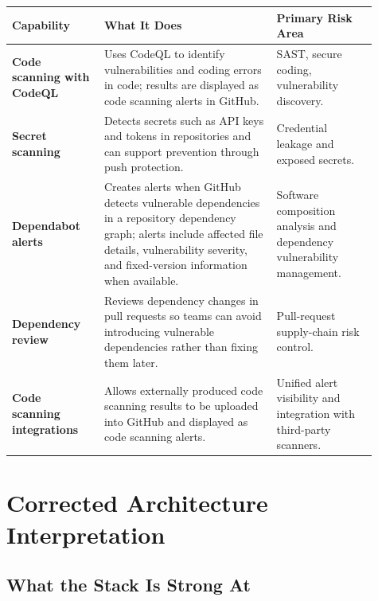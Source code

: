 \documentclass[11pt]{article}
\providecommand{\term}[1]{\textbf{#1}}
\begin{document}
\begin{longtable}{>{\raggedright\arraybackslash}p{0.23\linewidth} >{\raggedright\arraybackslash}p{0.43\linewidth} >{\raggedright\arraybackslash}p{0.25\linewidth}}
\toprule
\textbf{Capability} & \textbf{What It Does} & \textbf{Primary Risk Area} \\
\midrule
\endhead
\term{Code scanning with CodeQL} & Uses CodeQL to identify vulnerabilities and coding errors in code; results are displayed as code scanning alerts in GitHub.\cite{github-codeql-about} & SAST, secure coding, vulnerability discovery. \\
\midrule
\term{Secret scanning} & Detects secrets such as API keys and tokens in repositories and can support prevention through push protection.\cite{github-ghas-about,github-security-settings} & Credential leakage and exposed secrets. \\
\midrule
\term{Dependabot alerts} & Creates alerts when GitHub detects vulnerable dependencies in a repository dependency graph; alerts include affected file details, vulnerability severity, and fixed-version information when available.\cite{github-dependabot-alerts} & Software composition analysis and dependency vulnerability management. \\
\midrule
\term{Dependency review} & Reviews dependency changes in pull requests so teams can avoid introducing vulnerable dependencies rather than fixing them later.\cite{github-dependency-review} & Pull-request supply-chain risk control. \\
\midrule
\term{Code scanning integrations} & Allows externally produced code scanning results to be uploaded into GitHub and displayed as code scanning alerts.\cite{github-code-scanning-integration} & Unified alert visibility and integration with third-party scanners. \\
\bottomrule
\end{longtable}

\section{Corrected Architecture Interpretation}

\subsection{What the Stack Is Strong At}
\end{document}
